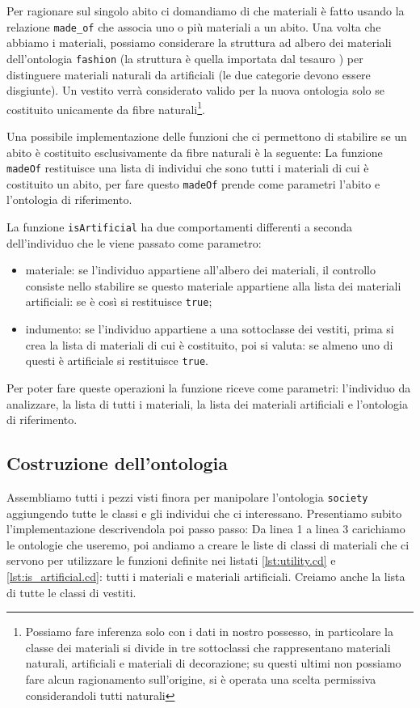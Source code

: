 Per ragionare sul singolo abito ci domandiamo di che materiali è fatto usando la relazione \verb|made_of| che associa uno o più materiali a un abito. Una volta che abbiamo i materiali, possiamo considerare la struttura ad albero dei materiali dell'ontologia \verb|fashion| (la struttura è quella importata dal tesauro ) per distinguere materiali naturali da artificiali (le due categorie devono essere disgiunte). Un vestito verrà considerato valido per la nuova ontologia solo se costituito unicamente da fibre naturali\footnote{Possiamo fare inferenza solo con i dati in nostro possesso, in particolare la classe dei materiali si divide in tre sottoclassi che rappresentano materiali naturali, artificiali e materiali di decorazione; su questi ultimi non possiamo fare alcun ragionamento sull'origine, si è operata una scelta permissiva considerandoli tutti naturali}.

Una possibile implementazione delle funzioni che ci permettono di stabilire se un abito è costituito esclusivamente da fibre naturali è la seguente:
La funzione \verb|madeOf| restituisce una lista di individui che sono tutti i materiali di cui è costituito un abito, per fare questo \verb|madeOf| prende come parametri l'abito e l'ontologia di riferimento. 

La funzione \verb|isArtificial| ha due comportamenti differenti a seconda dell'individuo che le viene passato come parametro:
\begin{itemize}
	\item materiale: se l'individuo appartiene all'albero dei materiali, il controllo consiste nello stabilire se questo materiale appartiene alla lista dei materiali artificiali: se è così si restituisce \verb|true|;
	\item indumento: se l'individuo appartiene a una sottoclasse dei vestiti, prima si crea la lista di materiali di cui è costituito, poi si valuta: se almeno uno di questi è artificiale si restituisce \verb|true|.
\end{itemize}
Per poter fare queste operazioni la funzione riceve come parametri: l'individuo da analizzare, la lista di tutti i materiali, la lista dei materiali artificiali e  l'ontologia di riferimento.
\subsection{Costruzione dell'ontologia}
Assembliamo tutti i pezzi visti finora per manipolare l'ontologia \verb|society| aggiungendo tutte le classi e gli individui che ci interessano. Presentiamo subito l'implementazione descrivendola poi passo passo:
Da linea 1 a linea 3 carichiamo le ontologie che useremo, poi andiamo a creare le liste di classi di materiali che ci servono per utilizzare le funzioni definite nei listati \ref{lst:utility.cd} e \ref{lst:is_artificial.cd}: tutti i materiali e materiali artificiali. Creiamo anche la lista di tutte le classi di vestiti.

